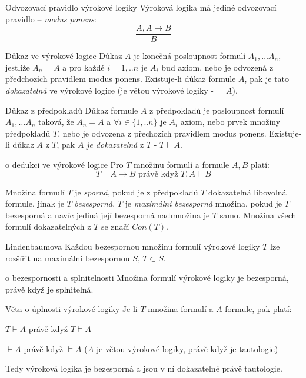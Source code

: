\begin{definiceN}{Odvozovací pravidlo výrokové logiky}
Výroková logika má jediné odvozovací pravidlo -- \emph{modus ponens}:
$$\frac{A,A\rightarrow B}{B} $$
\end{definiceN}

\begin{definiceN}{Důkaz ve výrokové logice}
Důkaz $A$ je konečná posloupnost formulí $A_1,\dots A_n$, jestliže $A_n = A$ a pro každé $i=1,..n$ je $A_i$ buď axiom, nebo je odvozená z předchozích pravidlem modus ponens. Existuje-li důkaz formule $A$, pak je tato \emph{dokazatelná} ve výrokové logice (je větou výrokové logiky - $\vdash A$).
\end{definiceN}

\begin{definiceN}{Důkaz z předpokladů}
Důkaz formule $A$ z předpokladů je posloupnost formulí $A_1,\dots A_n$ taková, že $A_n = A$ a $\forall i\in\{1,..n\}$ je $A_i$ axiom, nebo prvek množiny předpokladů $T$, nebo je odvozena z přechozích pravidlem modus ponens. Existuje-li důkaz $A$ z $T$, pak $A$ \emph{je dokazatelná} z $T$ - $T\vdash A$.
\end{definiceN}

\begin{vetaN}{o dedukci ve výrokové logice}
Pro $T$ množinu formulí a formule $A,B$ platí: $$T\vdash A\rightarrow B \mbox{ právě když } T,A\vdash B$$
\end{vetaN}


\begin{definice}
Množina formulí $T$ je \emph{sporná}, pokud je z předpokladů $T$ dokazatelná libovolná formule, jinak je $T$ \emph{bezesporná}. $T$ je \emph{maximální bezesporná} množina, pokud je $T$ bezesporná a navíc jediná její bezesporná nadmnožina je $T$ samo. Množina všech formulí dokazatelných z $T$ se značí $\mathit{Con}(T)$.
\end{definice}

\begin{vetaN}{Lindenbaumova}
Každou bezespornou množinu formulí výrokové logiky $T$ lze rozšířit na maximální bezespornou $S$, $T\subset S$.
\end{vetaN}

\begin{vetaN}{o bezespornosti a splnitelnosti}
Množina formulí výrokové logiky je bezesporná, právě když je splnitelná.
\end{vetaN}

\begin{vetaN}{Věta o úplnosti výrokové logiky}
Je-li $T$ množina formulí a $A$ formule, pak platí:
\begin{penumerate}
    \item $T\vdash A$ právě když $T\models A$
    \item $\vdash A$ právě když $\models A$ ($A$ je větou výrokové logiky, právě když je tautologie)
\end{penumerate}
Tedy výroková logika je bezesporná a jsou v ní dokazatelné právě tautologie.
\end{vetaN}

